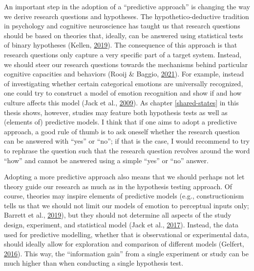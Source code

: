 \documentclass[11pt,american,a4paper,oneside,]{memoir} %
\begin{document}
An important step in the adoption of a ``predictive approach'' is changing the way we derive research questions and hypotheses. The hypothetico-deductive tradition in psychology and cognitive neuroscience has taught us that research questions should be based on theories that, ideally, can be answered using statistical tests of binary hypotheses (Kellen, \protect\hyperlink{ref-Kellen2019-af}{2019}). The consequence of this approach is that research questions only capture a very specific part of a target system. Instead, we should steer our research questions towards the mechanisms behind particular cognitive capacities and behaviors (Rooij \& Baggio, \protect\hyperlink{ref-Van_Rooij2021-bk}{2021}). For example, instead of investigating whether certain categorical emotions are universally recognized, one could try to construct a model of emotion recognition and show if and how culture affects this model (Jack et al., \protect\hyperlink{ref-Jack2009-yy}{2009}). As chapter \ref{shared-states} in this thesis shows, however, studies may feature both hypothesis tests as well as (elements of) predictive models. I think that if one aims to adopt a predictive approach, a good rule of thumb is to ask oneself whether the research question can be answered with ``yes'' or ``no''; if that is the case, I would recommend to try to rephrase the question such that the research question revolves around the word ``how'' and cannot be answered using a simple ``yes'' or ``no'' answer.

Adopting a more predictive approach also means that we should perhaps not let theory guide our research as much as in the hypothesis testing approach. Of course, theories may inspire elements of predictive models (e.g., constructionism tells us that we should not limit our models of emotion to perceptual inputs only; Barrett et al., \protect\hyperlink{ref-Barrett2019-bc}{2019}), but they should not determine all aspects of the study design, experiment, and statistical model (Jack et al., \protect\hyperlink{ref-Jack2017-qp}{2017}). Instead, the data used for predictive modelling, whether that is observational or experimental data, should ideally allow for exploration and comparison of different models (Gelfert, \protect\hyperlink{ref-Gelfert2016-hd}{2016}). This way, the ``information gain'' from a single experiment or study can be much higher than when conducting a single hypothesis test.
\end{document}
